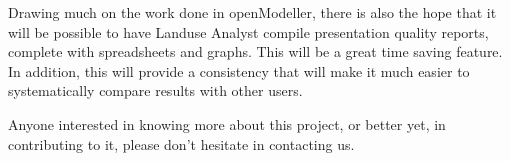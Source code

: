 Drawing much on the work done in openModeller, there is also the hope that it
will be possible to have Landuse Analyst compile presentation quality reports,
complete with spreadsheets and graphs.  This will be a great time saving
feature.  In addition, this will provide a consistency that will make it much
easier to systematically compare results with other users.

Anyone interested in knowing more about this project, or better yet, in
contributing to it, please don't hesitate in contacting us.











\begin{footnotesize}



\end{footnotesize}


\address{Jason Jorgenson\\ University of Liverpool\\
\url{http://www.arkygeek.com}\\ }

\address{Tim Sutton\\ Centro de Referncia em Informao Ambiental, CRIA\\ \url{http://cria.org.br}\\
}


